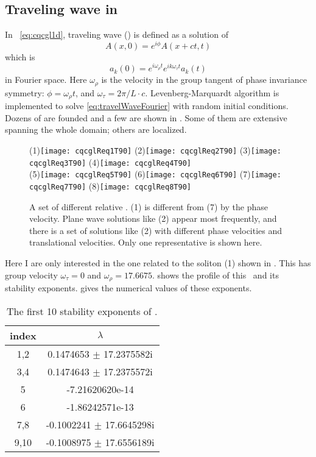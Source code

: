 \subsection{Traveling wave in \cqcGLe}
In \cqcGL\ \eqref{eq:cqcgl1d}, traveling wave (\reqv) is defined as
a solution of
\[
A(x, 0) = e^{i\phi}A(x+ct, t)
\]
which is
\begin{equation}
  a_k(0) = e^{i\omega_\rho t}e^{ik\omega_\tau t}a_k(t)
  \label{eq:travelWaveFourier}
\end{equation}
in Fourier space.
Here $\omega_\rho$ is the velocity in the group tangent of phase
invariance symmetry: $\phi = \omega_\rho t$, and $\omega_\tau= 2\pi/L\cdot c$.
Levenberg-Marquardt algorithm is implemented to solve \eqref{eq:travelWaveFourier}
with random initial conditions. Dozens of {\reqva} are founded and a few
are shown in .
Some of them are extensive spanning the whole domain; others are localized.
\begin{figure}[h]
  \centering
   (1)\texttt{[image: cqcglReq1T90]}
   (2)\texttt{[image: cqcglReq2T90]}
   (3)\texttt{[image: cqcglReq3T90]}
   (4)\texttt{[image: cqcglReq4T90]}\\
   (5)\texttt{[image: cqcglReq5T90]}
   (6)\texttt{[image: cqcglReq6T90]}
   (7)\texttt{[image: cqcglReq7T90]}
   (8)\texttt{[image: cqcglReq8T90]}
  \caption{
    A set of different relative \eqva. (1) is different from
    (7) by the phase velocity. Plane wave solutions like (2) appear
    most frequently, and there is a set of solutions like (2) with
    different phase velocities and translational velocities.
    Only one representative is shown here.
  }
  \label{fig:cqcglReqSet}
\end{figure}
Here I are only interested in the one related to the soliton
(1) shown in
. This {\reqv} has group velocity
$\omega_\tau = 0$ and $\omega_\rho=17.6675$.
 shows the profile of this \reqv\ and
its stability exponents.  gives
the numerical values of these exponents.
\begin{table}
  \centering
  \begin{tabular}{c | c}
    index & $\lambda$ \\
    \hline
     1,2    &    0.1474653 $\pm$      17.2375582i\\
     3,4    &    0.1474643 $\pm$      17.2375572i\\
     5    &    -7.21620620e-14             \\
     6    &     -1.86242571e-13  \\
     7,8    &   -0.1002241 $\pm$      17.6645298i\\
     9,10    &   -0.1008975 $\pm$      17.6556189i\\
     \hline
  \end{tabular}
  \caption{The first 10 stability exponents of {\reqv}
   .
 }
  \label{tab:req1Stability}
\end{table}

